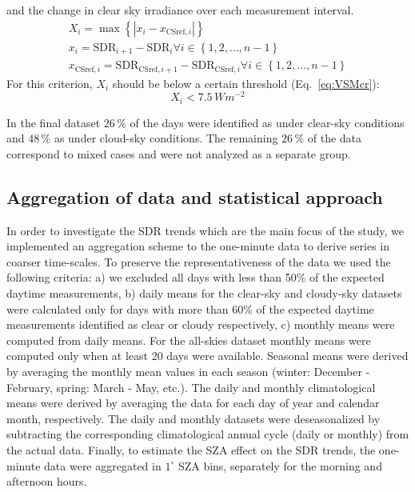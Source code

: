 \documentclass[applsci,article,submit,moreauthors,pdftex]{Definitions/mdpi}
\begin{document}
\begin{enumerate}
  and the change in clear sky irradiance over each measurement interval.
  \begin{gather}
    X_i = \max{\left \{ \left | x_i - x_{\text{CSref},i} \right | \right \}} \label{eq:VSM3} \\
    x_i = \text{SDR}_{i+1} - \text{SDR}_{i} \forall i \in \left \{ 1, 2, \ldots, n-1 \right \} \label{eq:VSM1} \\
    x_{\text{CSref},i} = \text{SDR}_{\text{CSref},i+1} - \text{SDR}_{\text{CSref},i} \forall i \in \left \{ 1, 2, \ldots, n-1 \right \} \label{eq:VSM2}
  \end{gather} For this criterion, \(X_i\) should be below a certain
  threshold (Eq.~\ref{eq:VSMcr}): \begin{equation}
    X_i < 7.5\,Wm^{-2} \label{eq:VSMcr}
  \end{equation}
\end{enumerate}

In the final dataset \(26\,\%\) of the days were identified as under
clear-sky conditions and \(48\,\%\) as under cloud-sky conditions. The
remaining \(26\,\%\) of the data correspond to mixed cases and were not
analyzed as a separate group.

\hypertarget{aggregationstatistical}{%
\subsection{Aggregation of data and statistical
approach}\label{aggregationstatistical}}

In order to investigate the SDR trends which are the main focus of the
study, we implemented an aggregation scheme to the one-minute data to
derive series in coarser time-scales. To preserve the representativeness
of the data we used the following criteria: a) we excluded all days with
less than 50\% of the expected daytime measurements, b) daily means for
the clear-sky and cloudy-sky datasets were calculated only for days with
more than 60\% of the expected daytime measurements identified as clear
or cloudy respectively, c) monthly means were computed from daily means.
For the all-skies dataset monthly means were computed only when at least
20 days were available. Seasonal means were derived by averaging the
monthly mean values in each season (winter: December - February, spring:
March - May, etc.). The daily and monthly climatological means were
derived by averaging the data for each day of year and calendar month,
respectively. The daily and monthly datasets were deseasonalized by
subtracting the corresponding climatological annual cycle (daily or
monthly) from the actual data. Finally, to estimate the SZA effect on
the SDR trends, the one-minute data were aggregated in \(1^{\circ}\) SZA
bins, separately for the morning and afternoon hours.
\end{document}
